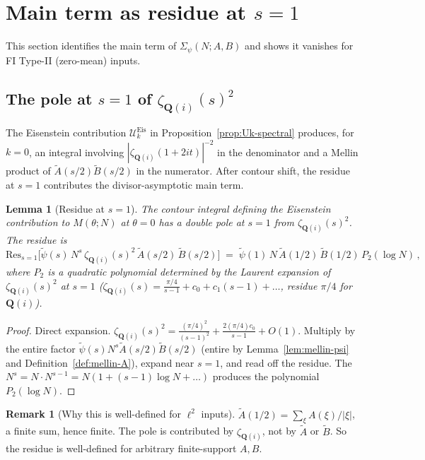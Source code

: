 \documentclass[11pt]{article}
\newtheorem{lemma}[theorem]{Lemma}
\theoremstyle{definition}
\newtheorem{remark}[theorem]{Remark}
\newcommand{\Q}{\mathbf{Q}}
\newcommand{\Qi}{\Q(i)}
\begin{document}

\section{Main term as residue at $s=1$}\label{sec:main-term}

This section identifies the main term of $\Sigma_\psi(N;A,B)$ and shows it vanishes for FI Type-II (zero-mean) inputs.

\subsection{The pole at $s=1$ of $\zeta_{\Qi}(s)^2$}\label{ssec:pole}

The Eisenstein contribution $\mathcal U_k^{\text{Eis}}$ in Proposition~\ref{prop:Uk-spectral} produces, for $k=0$, an integral involving $|\zeta_{\Qi}(1+2it)|^{-2}$ in the denominator and a Mellin product of $\widetilde A(s/2)\widetilde B(s/2)$ in the numerator. After contour shift, the residue at $s=1$ contributes the divisor-asymptotic main term.

\begin{lemma}[Residue at $s=1$]\label{lem:residue}
The contour integral defining the Eisenstein contribution to $M(\theta;N)$ at $\theta=0$ has a double pole at $s=1$ from $\zeta_{\Qi}(s)^2$. The residue is
\[
   \mathrm{Res}_{s=1}\bigl[\widetilde\psi(s)\,N^s\,\zeta_{\Qi}(s)^2\,\widetilde A(s/2)\,\widetilde B(s/2)\bigr]\;=\;\widetilde\psi(1)\,N\,\widetilde A(1/2)\,\widetilde B(1/2)\,P_2(\log N)\,,
\]
where $P_2$ is a quadratic polynomial determined by the Laurent expansion of $\zeta_{\Qi}(s)^2$ at $s=1$ ($\zeta_{\Qi}(s)=\frac{\pi/4}{s-1}+c_0+c_1(s-1)+\ldots$, residue $\pi/4$ for $\Qi$).
\end{lemma}

\begin{proof}
Direct expansion. $\zeta_{\Qi}(s)^2=\frac{(\pi/4)^2}{(s-1)^2}+\frac{2(\pi/4)c_0}{s-1}+O(1)$. Multiply by the entire factor $\widetilde\psi(s)N^s\widetilde A(s/2)\widetilde B(s/2)$ (entire by Lemma~\ref{lem:mellin-psi} and Definition~\ref{def:mellin-A}), expand near $s=1$, and read off the residue. The $N^s=N\cdot N^{s-1}=N(1+(s-1)\log N+\ldots)$ produces the polynomial $P_2(\log N)$.
\end{proof}

\begin{remark}[Why this is well-defined for $\ell^2$ inputs]\label{rem:residue-well-defined}
$\widetilde A(1/2)=\sum_\xi A(\xi)/|\xi|$, a finite sum, hence finite. The pole is contributed by $\zeta_{\Qi}$, not by $\widetilde A$ or $\widetilde B$. So the residue is well-defined for arbitrary finite-support $A,B$.
\end{remark}
\end{document}
